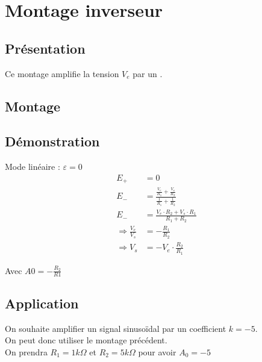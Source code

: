 


\chapter{Montage inverseur}
\section{Présentation}

Ce montage amplifie la tension $V_e$ par un .

\section{Montage}


\section{Démonstration}

Mode linéaire : $\varepsilon = 0$
\begin{align}
E_+&=0 \\
E_-&= \frac{ \frac{V_e}{R_1}+\frac{V_s}{R_2} } { \frac{1}{R_1} + \frac{1}{R_2}} \\
E_-&=\frac{V_e \cdot R_2 + V_s \cdot R_1}{R_1 + R_2} \\
\Rightarrow \frac{V_e}{V_s} &= -\frac{R_1}{R_2}\\
\Rightarrow V_s &= -V_e \cdot \frac{R_2}{R_1} 
\end{align}

Avec $A0= -\frac{R_2}{R1}$

\section{Application}

\begin{exemple}
On souhaite amplifier un signal sinusoïdal par un coefficient $k=-5$.\\
On peut donc utiliser le montage précédent. \\
On prendra $R_1=1 k\Omega$ et $R_2=5k\Omega$ pour avoir $A_0=-5$

\end{exemple}
